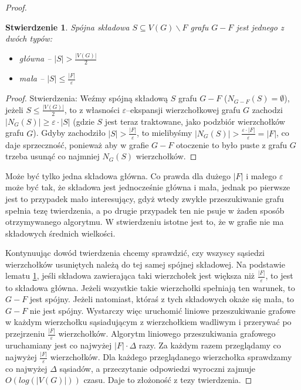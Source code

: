 \documentclass{pracamgr}
\newtheorem{claim}[theorem]{Stwierdzenie}
\begin{document}
   \begin{proof}
   \begin{claim}\label{klasyfikacja skladowych}
    Spójna składowa $S\subseteq V(G)\backslash F$ grafu $G-F$ jest jednego z dwóch typów:
    \begin{itemize}
     \item główna -- $|S|>\frac{|V(G)|}{2}$
     \item mała -- $|S|\le\frac{|F|}{\varepsilon}$
    \end{itemize}
   \end{claim}
   
   \begin{proof} Stwierdzenia:\newline
    Weźmy spójną składową $S$ grafu $G-F$ ($N_{G-F}(S)=\emptyset$), jeżeli $S\le\frac{|V(G)|}{2}$, to z własności $\varepsilon$--ekspansji wierzchołkowej grafu $G$
    zachodzi $|N_G(S)|\ge\varepsilon\cdot|S|$ (gdzie $S$ jest teraz traktowane, jako podzbiór wierzchołków grafu $G$). Gdyby zachodziło $|S|>\frac{|F|}{\varepsilon}$,
    to mielibyśmy $|N_G(S)|>\frac{\varepsilon\cdot|F|}{\varepsilon}=|F|$, co daje sprzeczność, ponieważ aby w grafie $G-F$ otoczenie to było puste z grafu
    $G$ trzeba usunąć co najmniej $N_G(S)$ wierzchołków.
   \end{proof}
   
    Może być tylko jedna składowa główna.
    Co prawda dla dużego $|F|$ i małego $\varepsilon$ może być tak, że składowa jest jednocześnie główna i mała, jednak po pierwsze jest to przypadek mało
    interesujący, gdyż wtedy zwykłe przeszukiwanie grafu spełnia tezę twierdzenia, a po drugie przypadek ten nie psuje w żaden sposób otrzymywanego algorytmu.
    W stwierdzeniu istotne jest to, że w grafie nie ma składowych średnich wielkości.\newline
    
    Kontynuując dowód twierdzenia
    chcemy sprawdzić, czy wszyscy sąsiedzi wierzchołków usuniętych należą do tej samej spójnej składowej. Na podstawie lematu \ref{klasyfikacja skladowych},
    jeśli składowa zawierająca taki wierzchołek jest większa niż $\frac{|F|}{\varepsilon}$, to jest to składowa główna.
    Jeżeli wszystkie takie wierzchołki spełniają ten warunek, to $G-F$ jest spójny.
    Jeżeli natomiast, któraś z tych składowych okaże się mała, to $G-F$ nie jest spójny.\newline
    Wystarczy więc uruchomić liniowe przeszukiwanie grafowe w każdym wierzchołku sąsiadującym z wierzchołkiem wadliwym i przerywać po przejrzeniu
    $\frac{|F|}{\varepsilon}$ wierzchołków.\newline
    Algorytm liniowego przeszukiwania grafowego uruchamiany jest co najwyżej $|F|\cdot\Delta$ razy.
    Za każdym razem przeglądamy co najwyżej $\frac{|F|}{\varepsilon}$ wierzchołków.
    Dla każdego przeglądanego wierzchołka sprawdzamy co najwyżej $\Delta$ sąsiadów, a przeczytanie odpowiedzi wyroczni zajmuje $O(log(|V(G)|))$ czasu.
    Daje to złożoność z tezy twierdzenia.
   \end{proof}
\end{document}
